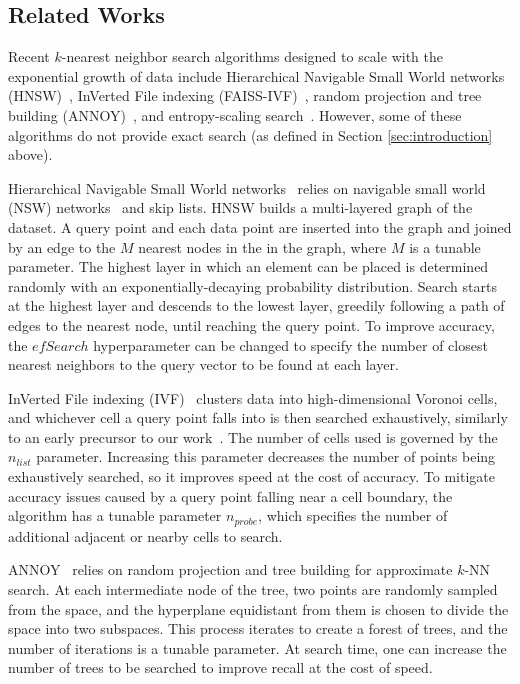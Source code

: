 \subsection{Related Works}
\label{sec:intoduction:related-works}

Recent $k$-nearest neighbor search algorithms designed to scale with the exponential growth of data include Hierarchical Navigable Small World networks (HNSW)~\cite{Malkov2016EfficientAR}, InVerted File indexing (FAISS-IVF)~\cite{faissivf}, random projection and tree building (ANNOY)~\cite{annoy}, and entropy-scaling search~\cite{yu2015entropy, ishaq2019clustered}. However, some of these algorithms do not provide exact search (as defined in Section \ref{sec:introduction} above).

Hierarchical Navigable Small World networks~\cite{Malkov2016EfficientAR} relies on navigable small world (NSW) networks~\cite{kleinberg2000navigation, boguna2009navigability} and skip lists.
HNSW builds a multi-layered graph of the dataset.
A query point and each data point are inserted into the graph and joined by an edge to the $M$ nearest nodes in the in the graph, where $M$ is a tunable parameter.
The highest layer in which an element can be placed is determined randomly with an exponentially-decaying probability distribution.
Search starts at the highest layer and descends to the lowest layer, greedily following a path of edges to the nearest node, until reaching the query point.
To improve accuracy, the $efSearch$ hyperparameter can be changed to specify the number of closest nearest neighbors to the query vector to be found at each layer.

InVerted File indexing (IVF)~\cite{faissivf, sacks1987multikey, kent1990signature} clusters data into high-dimensional Voronoi cells, and whichever cell a query point falls into is then searched exhaustively, similarly to an early precursor to our work~\cite{yu2015entropy}.
The number of cells used is governed by the $n_{list}$ parameter.
Increasing this parameter decreases the number of points being exhaustively searched, so it improves speed at the cost of accuracy.
To mitigate accuracy issues caused by a query point falling near a cell boundary, the algorithm has a tunable parameter $n_{probe}$, which specifies the number of additional adjacent or nearby cells to search.

ANNOY~\cite{annoy} relies on random projection and tree building for approximate $k$-NN search.
At each intermediate node of the tree, two points are randomly sampled from the space, and the hyperplane equidistant from them is chosen to divide the space into two subspaces.
This process iterates to create a forest of trees, and the number of iterations is a tunable parameter.
At search time, one can increase the number of trees to be searched to improve recall at the cost of speed.

